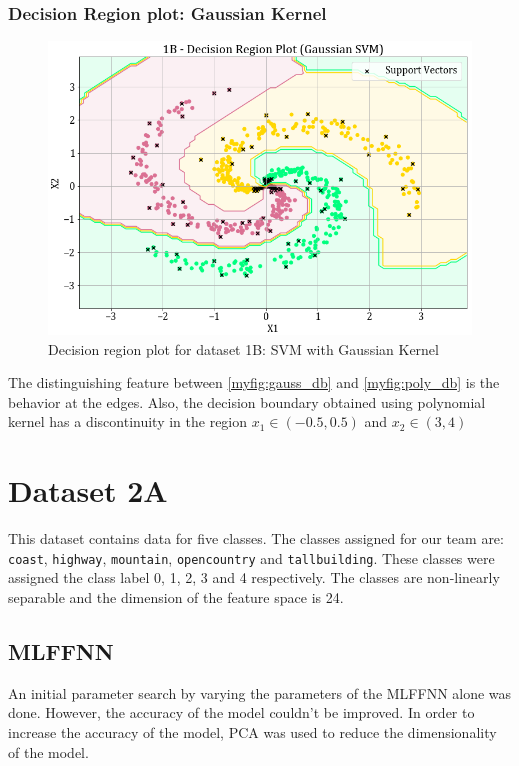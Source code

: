 \documentclass[11pt,a4paper]{article}
\def\tt#1{\texttt{#1}}
\begin{document}
\subsubsection{Decision Region plot: Gaussian Kernel}

\begin{figure}[H]
    \centering
    \includegraphics[scale=0.5]{images/1B_SVM_gauss_decision_plot.png}
    \caption{Decision region plot for dataset 1B: SVM with Gaussian Kernel}
    \label{myfig:gauss_db}
\end{figure}

The distinguishing feature between \autoref{myfig:gauss_db} and \autoref{myfig:poly_db} is the behavior at the edges. Also, the decision boundary obtained using polynomial kernel has a discontinuity in the region $x_1 \in (-0.5,0.5)$ and $x_2 \in (3,4)$

\break
\section{Dataset 2A}
This dataset contains data for five classes. The classes assigned for our team are: \tt{coast}, \tt{highway}, \tt{mountain}, \tt{opencountry} and \tt{tallbuilding}. These classes were assigned the class label 0, 1, 2, 3 and 4 respectively. The classes are non-linearly separable and the dimension of the feature space is 24.

\subsection{MLFFNN}
An initial parameter search by varying the parameters of the MLFFNN alone was done. However, the accuracy of the model couldn't be improved. In order to increase the accuracy of the model, PCA was used to reduce the dimensionality of the model.\\
\end{document}
